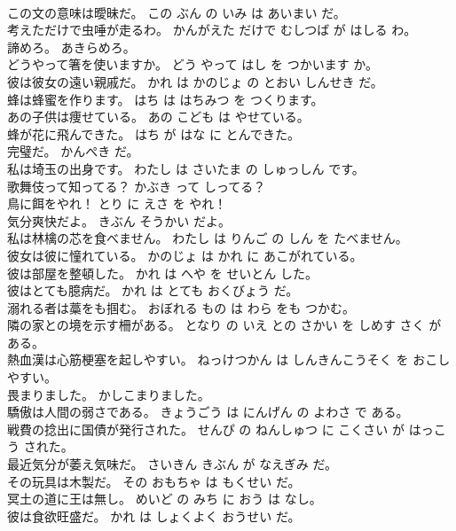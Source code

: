 \documentclass[8pt]{extreport}
\begin{document}
\begin{CJK}{UTF8}{min}
\\	この文の意味は曖昧だ。	この ぶん の いみ は あいまい だ。	
\\	考えただけで虫唾が走るわ。	かんがえた だけで むしつば が はしる わ。	
\\	諦めろ。	あきらめろ。	
\\	どうやって箸を使いますか。	どう やって はし を つかいます か。	
\\	彼は彼女の遠い親戚だ。	かれ は かのじょ の とおい しんせき だ。	
\\	蜂は蜂蜜を作ります。	はち は はちみつ を つくります。	
\\	あの子供は痩せている。	あの こども は やせている。	
\\	蜂が花に飛んできた。	はち が はな に とんできた。	
\\	完璧だ。	かんぺき だ。	
\\	私は埼玉の出身です。	わたし は さいたま の しゅっしん です。	
\\	歌舞伎って知ってる？	かぶき って しってる？	
\\	鳥に餌をやれ！	とり に えさ を やれ！	
\\	気分爽快だよ。	きぶん そうかい だよ。	
\\	私は林檎の芯を食べません。	わたし は りんご の しん を たべません。	
\\	彼女は彼に憧れている。	かのじょ は かれ に あこがれている。	
\\	彼は部屋を整頓した。	かれ は へや を せいとん した。	
\\	彼はとても臆病だ。	かれ は とても おくびょう だ。	
\\	溺れる者は藁をも掴む。	おぼれる もの は わら をも つかむ。	
\\	隣の家との境を示す柵がある。	となり の いえ との さかい を しめす さく が ある。	
\\	熱血漢は心筋梗塞を起しやすい。	ねっけつかん は しんきんこうそく を おこし やすい。	
\\	畏まりました。	かしこまりました。	
\\	驕傲は人間の弱さである。	きょうごう は にんげん の よわさ で ある。	
\\	戦費の捻出に国債が発行された。	せんぴ の ねんしゅつ に こくさい が はっこう された。	
\\	最近気分が萎え気味だ。	さいきん きぶん が なえぎみ だ。	
\\	その玩具は木製だ。	その おもちゃ は もくせい だ。	
\\	冥土の道に王は無し。	めいど の みち に おう は なし。	
\\	彼は食欲旺盛だ。	かれ は しょくよく おうせい だ。	

\end{CJK}
\end{document}
